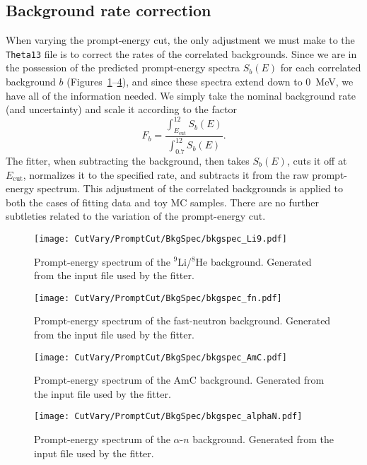 \documentclass[../thesis.tex]{subfiles}
\begin{document}
\subsection{Background rate correction}
\label{sec:cutVaryPromptCutBkg}

When varying the prompt-energy cut, the only adjustment we must make to the \texttt{Theta13} file is to correct the rates of the correlated backgrounds. Since we are in the possession of the predicted prompt-energy spectra $S_b(E)$ for each correlated background $b$ (Figures~\ref{fig:bkgspec_Li9}--\ref{fig:bkgspec_alphaN}), and since these spectra extend down to 0~MeV, we have all of the information needed. We simply take the nominal background rate (and uncertainty) and scale it according to the factor
\begin{equation}
  F_b = \frac{\int_{E_{\mathrm{cut}}}^{12} S_b(E)}{\int_{0.7}^{12} S_b(E)}.
\end{equation}
The fitter, when subtracting the background, then takes $S_b(E)$, cuts it off at $E_{\mathrm{cut}}$, normalizes it to the specified rate, and subtracts it from the raw prompt-energy spectrum. This adjustment of the correlated backgrounds is applied to both the cases of fitting data and toy MC samples. There are no further subtleties related to the variation of the prompt-energy cut.

\begin{figure}[h]
  \texttt{[image: CutVary/PromptCut/BkgSpec/bkgspec\_Li9.pdf]}
  \caption{Prompt-energy spectrum of the $^9$Li/$^8$He background. Generated from the input file used by the fitter.}
  \label{fig:bkgspec_Li9}
\end{figure}

\begin{figure}[h]
  \texttt{[image: CutVary/PromptCut/BkgSpec/bkgspec\_fn.pdf]}
  \caption{Prompt-energy spectrum of the fast-neutron background. Generated from the input file used by the fitter.}
  \label{fig:bkgspec_fn}
\end{figure}

\begin{figure}[h]
  \texttt{[image: CutVary/PromptCut/BkgSpec/bkgspec\_AmC.pdf]}
  \caption{Prompt-energy spectrum of the AmC background. Generated from the input file used by the fitter.}
  \label{fig:bkgspec_AmC}
\end{figure}

\begin{figure}[h]
  \texttt{[image: CutVary/PromptCut/BkgSpec/bkgspec\_alphaN.pdf]}
  \caption{Prompt-energy spectrum of the $\alpha$-$n$ background. Generated from the input file used by the fitter.}
  \label{fig:bkgspec_alphaN}
\end{figure}
\end{document}

